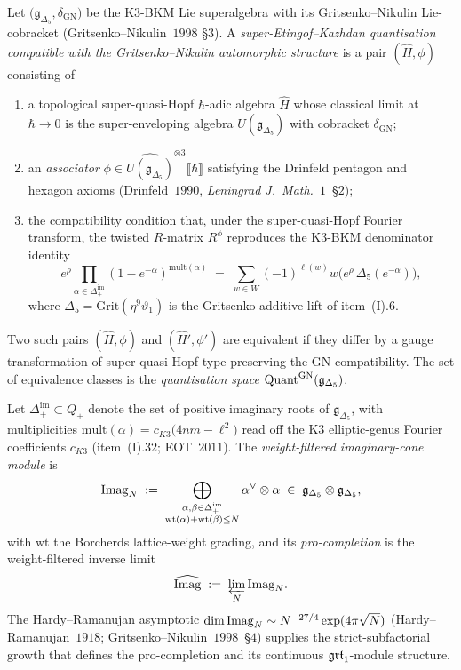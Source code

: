 \begin{definition}
\label{def:qgf-quant-delta5}
Let $\bigl(\mathfrak g_{\Delta_5}, \delta_{\mathrm{GN}}\bigr)$ be the
K$3$-BKM Lie superalgebra with its Gritsenko--Nikulin Lie-cobracket
(Gritsenko--Nikulin~$1998$ \S$3$). A \emph{super-Etingof--Kazhdan
quantisation compatible with the Gritsenko--Nikulin automorphic
structure} is a pair $(\widehat H, \phi)$ consisting of
\begin{enumerate}
\item[(a)] a topological super-quasi-Hopf $\hbar$-adic algebra
$\widehat H$ whose classical limit at $\hbar\to 0$ is the
super-enveloping algebra $U(\mathfrak g_{\Delta_5})$ with cobracket
$\delta_{\mathrm{GN}}$;
\item[(b)] an \emph{associator} $\phi \in
\widehat{U(\mathfrak g_{\Delta_5})}^{\otimes 3}\llbracket\hbar\rrbracket$
satisfying the Drinfeld pentagon and hexagon axioms
(Drinfeld~$1990$, \emph{Leningrad J.\ Math.}~$1$~\S$2$);
\item[(c)] the compatibility condition that, under the
super-quasi-Hopf Fourier transform, the twisted $R$-matrix
$R^\phi$ reproduces the K$3$-BKM denominator identity
\[
e^{\rho}\prod_{\alpha\in\Delta_+^{\mathrm{im}}}
(1 - e^{-\alpha})^{\mathrm{mult}(\alpha)}
\;=\;
\sum_{w\in W}(-1)^{\ell(w)} w\bigl(e^{\rho}\,\Delta_5(e^{-\alpha})\bigr),
\]
where $\Delta_5 = \mathrm{Grit}(\eta^9\vartheta_1)$ is the
Gritsenko additive lift of item~(I).$6$.
\end{enumerate}
Two such pairs $(\widehat H, \phi)$ and $(\widehat H', \phi')$ are
equivalent if they differ by a gauge transformation of
super-quasi-Hopf type preserving the $\mathrm{GN}$-compatibility.
The set of equivalence classes is the \emph{quantisation space}
$\mathrm{Quant}^{\mathrm{GN}}(\mathfrak g_{\Delta_5})$.
\end{definition}

\begin{definition}
\label{def:qgf-imag-pro}
Let $\Delta_+^{\mathrm{im}}\subset Q_+$ denote the set of positive
imaginary roots of $\mathfrak g_{\Delta_5}$, with multiplicities
$\mathrm{mult}(\alpha) = c_{K3}\bigl(4nm - \ell^2\bigr)$ read off the
K$3$ elliptic-genus Fourier coefficients $c_{K3}$
(item~(I).$32$; EOT~$2011$). The \emph{weight-filtered
imaginary-cone module} is
\[
\mathrm{Imag}_N
\;:=\;
\bigoplus_{\substack{\alpha, \beta\in\Delta_+^{\mathrm{im}}\\
\mathrm{wt}(\alpha) + \mathrm{wt}(\beta)\le N}}
\alpha^\vee\otimes\alpha \;\in\;
\mathfrak g_{\Delta_5}\otimes\mathfrak g_{\Delta_5},
\]
with $\mathrm{wt}$ the Borcherds lattice-weight grading, and its
\emph{pro-completion} is the weight-filtered inverse limit
\[
\widehat{\mathrm{Imag}}
\;:=\;
\varprojlim_{N}\mathrm{Imag}_N.
\]
The Hardy--Ramanujan asymptotic
$\dim\mathrm{Imag}_N \sim N^{-27/4}\exp(4\pi\sqrt N)$
(Hardy--Ramanujan~$1918$; Gritsenko--Nikulin~$1998$~\S$4$) supplies
the strict-subfactorial growth that defines the pro-completion and its
continuous $\mathfrak{grt}_1$-module structure.
\end{definition}

